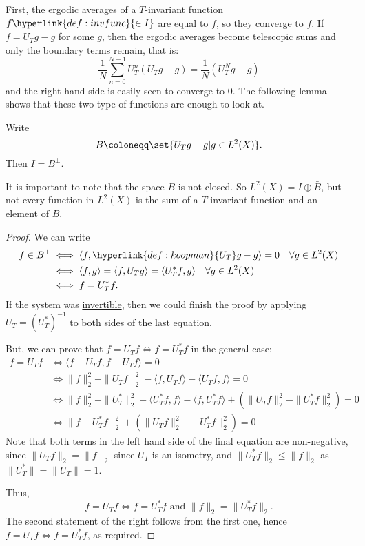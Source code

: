 \documentclass{article}
\begin{document}
First, the ergodic averages of a $T$-invariant function $f \hyperlink{def:invfunc}{\in I}$ are equal to $f$, so they converge to $f$.
If $f = U_T g - g$ for some $g$, then the \hyperlink{def:ergavg}{ergodic averages} become telescopic sums and only the boundary terms remain, that is:
\begin{equation*}
  \frac{1}{N} \sum_{n=0}^{N-1} U_T^n(U_T g - g) = \frac{1}{N} (U_T^N g - g)
\end{equation*}
and the right hand side is easily seen to converge to $0$.
The following lemma shows that these two type of functions are enough to look at.
\begin{lemma}
  Write
  \begin{equation*}
    B \coloneqq \set{U_T g - g | g \in L^2(X)}.
  \end{equation*}
  Then $I = B^\perp$.
\end{lemma}
It is important to note that the space $B$ is not closed. So $L^2(X) = I \oplus \bar{B}$, but not every function in $L^2(X)$ is the sum of a $T$-invariant function and an element of $B$.
\begin{proof}
  We can write
  \begin{align*}
    f \in B^\perp &\iff \langle f, \hyperlink{def:koopman}{U_T} g - g \rangle = 0 \quad \forall g \in L^2(X) \\
                  &\iff \langle f, g \rangle = \langle f, U_T g \rangle = \langle U_T^* f, g \rangle \quad \forall g \in L^2(X) \\
                  &\iff f = U_T^* f.
  \end{align*}
  If the system was \hyperlink{def:inv}{invertible}, then we could finish the proof by applying $U_T = (U_T^*)^{-1}$ to both sides of the last equation.

  But, we can prove that $f = U_T f \iff f = U_T^* f$ in the general case:
  \begin{align*}
    f = U_T f &\iff \langle f - U_T f, f - U_T f \rangle = 0 \\
              &\iff\|f\|_2^2+\|U_T f\|^2_2-\langle f,U_Tf\rangle-\langle U_Tf,f\rangle=0 \\
              &\iff\|f\|_2^2+\|U_T^*\|_2^2-\langle U_T^*f,f\rangle-\langle f,U_T^*f\rangle + (\|U_Tf\|^2_2-\|U_T^*f\|_2^2) = 0 \\
              &\iff\|f-U_T^*f\|_2^2+(\|U_Tf\|_2^2-\|U_T^*f\|_2^2)=0
  \end{align*}
  Note that both terms in the left hand side of the final equation are non-negative, since $\|U_Tf\|_2=\|f\|_2$ since $U_T$ is an isometry, and $\|U_T^*f\|_2\leq\|f\|_2$ as $\|U_T^*\|=\|U_T\|=1$.

  Thus,
  \begin{equation*}
    f = U_T f \iff f = U_T^* f\text{ and }\|f\|_2 = \|U_T^*f\|_2.
  \end{equation*}
  The second statement of the right follows from the first one, hence $f = U_T f \iff f = U_T^*f$, as required.
\end{proof}
\end{document}
